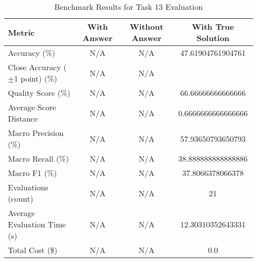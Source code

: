 \begin{table}[htbp]
\centering
\caption{Benchmark Results for Task 13 Evaluation}
\begin{tabular}{lccc}
\toprule
\textbf{Metric} & \textbf{With Answer} & \textbf{Without Answer} & \textbf{With True Solution} \\
\midrule
Accuracy (\%) & N/A & N/A & 47.61904761904761 \\
Close Accuracy ($\pm$1 point) (\%) & N/A & N/A \\
Quality Score (\%) & N/A & N/A & 66.66666666666666 \\
Average Score Distance & N/A & N/A & 0.6666666666666666 \\
Macro Precision (\%) & N/A & N/A & 57.93650793650793 \\
Macro Recall (\%) & N/A & N/A & 38.888888888888886 \\
Macro F1 (\%) & N/A & N/A & 37.8066378066378 \\
Evaluations (count) & N/A & N/A & 21 \\
Average Evaluation Time (s) & N/A & N/A & 12.30310352643331 \\
Total Cost (\$) & N/A & N/A & 0.0 \\
\bottomrule
\end{tabular}
\end{table}